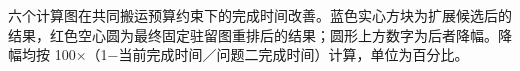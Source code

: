 六个计算图在共同搬运预算约束下的完成时间改善。蓝色实心方块为扩展候选后的结果，红色空心圆为最终固定驻留图重排后的结果；圆形上方数字为后者降幅。降幅均按 100×（1−当前完成时间／问题二完成时间）计算，单位为百分比。
